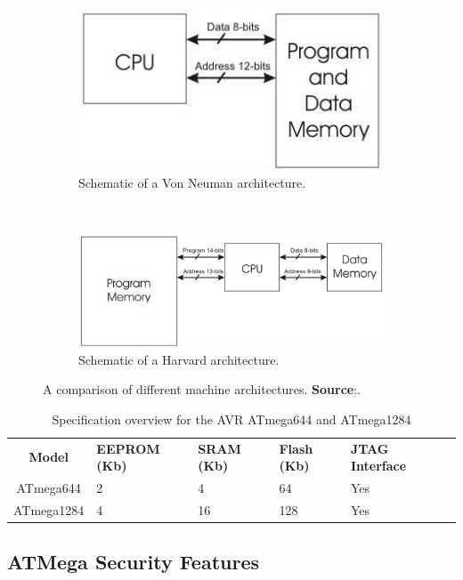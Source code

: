 \documentclass[10pt,a4paper,twocolumn]{article}
\begin{document}
\begin{figure}
	\begin{subfigure}{0.5\textwidth}
		\center
		\includegraphics[scale=0.5]{img/von_neuman_arch.jpg}
		\caption{Schematic of a Von Neuman architecture.}
		\label{fig:VN_arch}
	\end{subfigure} 
	~
	\begin{subfigure}{0.5\textwidth}
		\center
		\includegraphics[scale=0.5]{img/harvard_arch.jpeg}
		\caption{Schematic of a Harvard architecture.}
		\label{fig:H_arch}
	\end{subfigure}
	\caption{A comparison of different machine architectures. \textbf{Source}:\protect\citep{website:mcu_primer}.}
	\label{fig:architectures}
\end{figure}	
		
\begin{table}
	\begin{tabular}{| c | p{2cm} | p{1.5cm} | p{1.5cm} | p{2.8cm} | p{1.9cm} |}
		\textbf{Model} & \textbf{EEPROM (Kb)} & \textbf{SRAM (Kb)} & \textbf{Flash (Kb)} & \textbf{JTAG Interface}\\
		ATmega644 & 2 & 4 & 64 & Yes\\
		ATmega1284 & 4 & 16 & 128 & Yes \\
	\end{tabular}
	\caption{Specification overview for the AVR ATmega644 and ATmega1284}
	\label{table:avr_specs}
\end{table}
	
	\subsection{ATMega Security Features}
	
\end{document}

